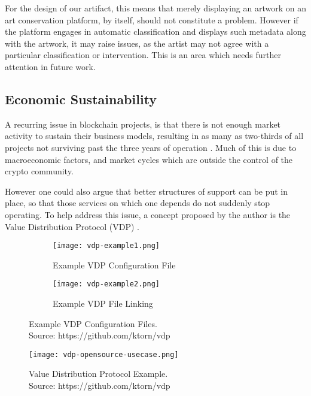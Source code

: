 For the design of our artifact, this means that merely displaying an artwork on an art conservation platform, by itself, should not constitute a problem. However if the platform engages in automatic classification and displays such metadata along with the artwork, it may raise issues, as the artist may not agree with a particular classification or intervention. This is an area which needs further attention in future work.


\subsection{Economic Sustainability}

A recurring issue in blockchain projects, is that there is not enough market activity to sustain their business models, resulting in as many as two-thirds of all projects not surviving past the three years of operation \cite{franjkovicCryptocurrencyGraveyardTwoThirds2024}. Much of this is due to macroeconomic factors, and market cycles which are outside the control of the crypto community.

However one could also argue that better structures of support can be put in place, so that those services on which one depends do not suddenly stop operating. To help address this issue, a concept proposed by the author is the Value Distribution Protocol (VDP) \cite{HackcoinHongKong2015} \cite{farinhaGrokyaPrivacyFriendlyFramework2016}.


\begin{figure}[H]
  \centering
  \captionsetup{justification=centering}
  \begin{subfigure}[b]{0.45\textwidth}
    \centering
    \texttt{[image: vdp-example1.png]}
    \caption{Example VDP Configuration File}
    \label{fig:vdp1}
  \end{subfigure}
  \hfill
  \begin{subfigure}[b]{0.45\textwidth}
    \centering
    \texttt{[image: vdp-example2.png]}
    \caption{Example VDP File Linking}
    \label{fig:vdp2}
  \end{subfigure}
  \caption[Example VDP Configuration Files]{Example VDP Configuration Files. \\ Source: https://github.com/ktorn/vdp}
  \label{fig:vdp-examples}
\end{figure}


\begin{figure}[h]
    \centering
    \captionsetup{justification=centering}
    \texttt{[image: vdp-opensource-usecase.png]}
    \captionsetup{justification=centering}
    \caption[Value Distribution Protocol Example]{Value Distribution Protocol Example. \\ Source: https://github.com/ktorn/vdp}
    \label{fig:vdp}
\end{figure}

